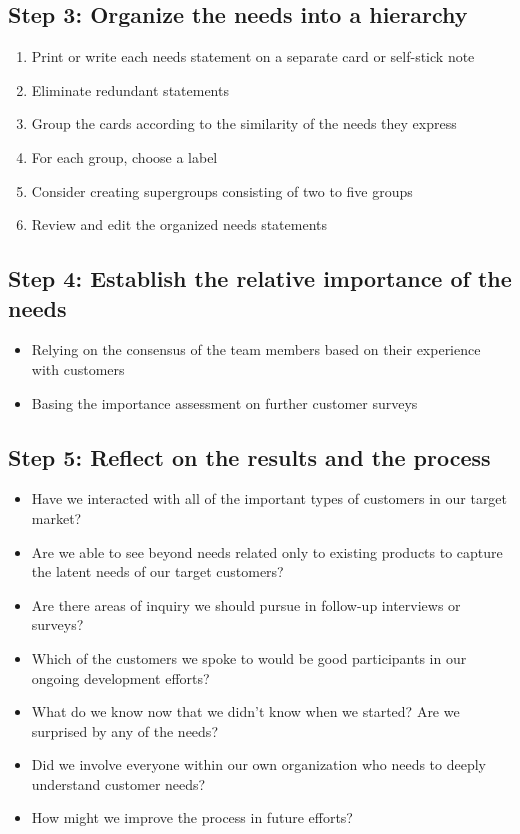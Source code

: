 \documentclass[a4paper,12pt,openany]{book}
\begin{document}
\subsection{Step 3: Organize the needs into a hierarchy}
\begin{enumerate}
    \item Print or write each needs statement on a separate card or self-stick note
    \item Eliminate redundant statements
    \item Group the cards according to the similarity of the needs they express
    \item For each group, choose a label
    \item Consider creating supergroups consisting of two to five groups
    \item Review and edit the organized needs statements
\end{enumerate}

\subsection{Step 4: Establish the relative importance of the needs}
\begin{itemize}
    \item Relying on the consensus of the team members based on their experience with customers
    \item Basing the importance assessment on further customer surveys
\end{itemize}

\subsection{Step 5: Reflect on the results and the process}
\begin{itemize}
    \item Have we interacted with all of the important types of customers in our target market?
    \item Are we able to see beyond needs related only to existing products to capture the latent needs of our target customers?
    \item Are there areas of inquiry we should pursue in follow-up interviews or surveys?
    \item Which of the customers we spoke to would be good participants in our ongoing development efforts?
    \item What do we know now that we didn’t know when we started? Are we surprised by any of the needs?
    \item Did we involve everyone within our own organization who needs to deeply understand customer needs?
    \item How might we improve the process in future efforts?
\end{itemize}
\end{document}
